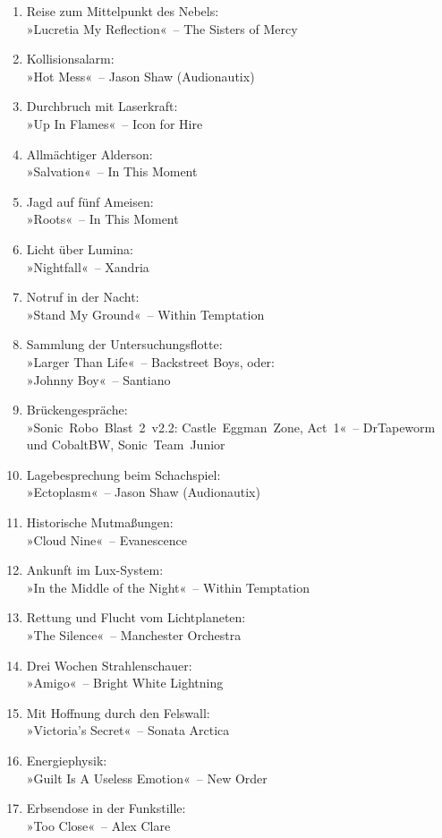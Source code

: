 \begin{enumerate}
    \item Reise zum Mittelpunkt des Nebels:\\ »Lucretia My Reflection«~– The Sisters of Mercy
    \item Kollisionsalarm:\\ »Hot Mess«~– Jason Shaw (Audionautix)
    \item Durchbruch mit Laserkraft:\\ »Up In Flames«~– Icon for Hire
    \item Allmächtiger Alderson:\\ »Salvation«~– In This Moment
    \item Jagd auf fünf Ameisen:\\ »Roots«~– In This Moment
    \item Licht über Lumina:\\ »Nightfall«~– Xandria
    \item Notruf in der Nacht:\\ »Stand My Ground«~– Within Temptation
    \item Sammlung der Untersuchungsflotte:\\ »Larger Than Life«~– Backstreet Boys, oder:\\ »Johnny Boy«~– Santiano
    \item Brückengespräche:\\ »Sonic~Robo~Blast~2~v2.2: Castle~Eggman~Zone, Act~1«~– DrTapeworm und CobaltBW, Sonic~Team~Junior
    \item Lagebesprechung beim Schachspiel:\\ »Ectoplasm«~– Jason Shaw (Audionautix)
    \item Historische Mutmaßungen:\\ »Cloud Nine«~– Evanescence
    \item Ankunft im Lux-System:\\ »In the Middle of the Night«~– Within Temptation
    \item Rettung und Flucht vom Lichtplaneten:\\ »The Silence«~– Manchester Orchestra
    \item Drei Wochen Strahlenschauer:\\ »Amigo«~– Bright White Lightning
    \item Mit Hoffnung durch den Felswall:\\ »Victoria’s Secret«~– Sonata Arctica
    \item Energiephysik:\\ »Guilt Is A Useless Emotion«~– New Order
    \item Erbsendose in der Funkstille:\\ »Too Close«~– Alex Clare

\end{enumerate}
